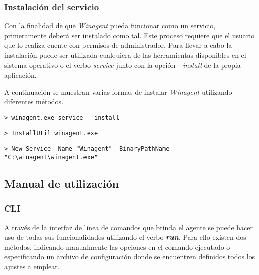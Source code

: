         \subsubsection{Instalación del servicio}
            Con la finalidad de que \textit{Winagent} pueda funcionar como un servicio, primeramente deberá ser instalado como tal. Este proceso requiere que el usuario que lo realiza cuente con permisos de administrador. Para llevar a cabo la instalación puede ser utilizada cualquiera de las herramientas disponibles en el sistema operativo o el verbo \textit{service} junto con la opción \textit{-{}-install} de la propia aplicación.
            
            A continuación se muestran varias formas de instalar \textit{Winagent} utilizando diferentes métodos.
            
            \begin{lstlisting}[style=batch, caption=Instalación el servicio utilizando el propio agente]
                > winagent.exe service --install
            \end{lstlisting}
            
            \begin{lstlisting}[style=batch, caption=Instalación el servicio mediante la utilidad \textit{InstallUtil}]
                > InstallUtil winagent.exe
            \end{lstlisting}
            
            \begin{lstlisting}[style=batch, caption=Instalación el servicio utilizando \textit{PowerShell}]
                > New-Service -Name "Winagent" -BinaryPathName "C:\winagent\winagent.exe"
            \end{lstlisting}
            
     \subsection{Manual de utilización}
        \subsubsection{CLI}
            A través de la interfaz de línea de comandos que brinda el agente se puede hacer uso de todas sus funcionalidades utilizando el verbo \textbf{\textit{run}}. Para ello existen dos métodos, indicando manualmente las opciones en el comando ejecutado o especificando un archivo de configuración donde se encuentren definidos todos los ajustes a emplear.
            
